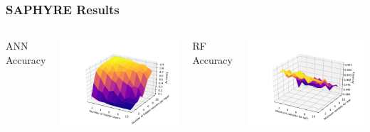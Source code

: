\documentclass{beamer}
\begin{document}
\begin{frame}
\frametitle{SAPHYRE Results}
\begin{columns}[c]
\begin{center}
ANN Accuracy
\end{center}
\includegraphics[width=\textwidth]{saphyre/ANN/sgd_val}
\begin{center}
RF Accuracy
\end{center}
\includegraphics[width=\textwidth]{saphyre/RFR/entropy_val}
\end{columns}
\end{frame}
\end{document}
